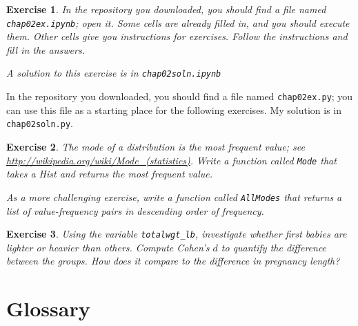 \documentclass[12pt]{book}
\theoremstyle{exercise}
\newtheorem{exercise}{Exercise}[chapter]
\begin{document}
\begin{exercise}
In the repository you downloaded, you should find a file named
\verb"chap02ex.ipynb"; open it.  Some cells are already filled in, and
you should execute them.  Other cells give you instructions for
exercises.  Follow the instructions and fill in the answers.

A solution to this exercise is in \verb"chap02soln.ipynb"
\end{exercise}

In the repository you downloaded, you should find a file named
\verb"chap02ex.py"; you can use this file as a starting place
for the following exercises.
My solution is in \verb"chap02soln.py".

\begin{exercise}
The mode of a distribution is the most frequent value; see
\url{http://wikipedia.org/wiki/Mode_(statistics)}.  Write a function
called {\tt Mode} that takes a Hist and returns the most
frequent value.%

As a more challenging exercise, write a function called {\tt AllModes}
that returns a list of value-frequency pairs in descending order of
frequency.%
\end{exercise}

\begin{exercise}
Using the variable \verb"totalwgt_lb", investigate whether first
babies are lighter or heavier than others.  Compute Cohen's $d$
to quantify the difference between the groups.  How does it
compare to the difference in pregnancy length?%
\end{exercise}


\section{Glossary}
\end{document}
